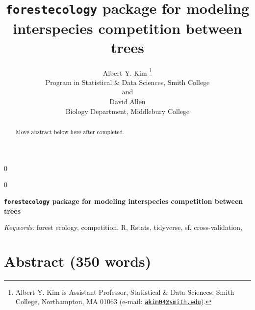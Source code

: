\documentclass[12pt]{article}
\newcommand{\blind}{0}
\begin{document}
\def\spacingset#1{\renewcommand{\baselinestretch}%
{#1}\small\normalsize} \spacingset{1}



\blind
{
  \title{\bf \texttt{forestecology} package for modeling interspecies competition
between trees}

  \author{
        Albert Y. Kim \thanks{Albert Y. Kim is Assistant Professor, Statistical \& Data Sciences,
Smith College, Northampton, MA 01063 (e-mail:
\href{mailto:akim04@smith.edu}{\nolinkurl{akim04@smith.edu}}).} \\
    Program in Statistical \& Data Sciences, Smith College\\
     and \\     David Allen \\
    Biology Department, Middlebury College\\
      }
  \maketitle
} \fi

\blind
{
  \bigskip
  \bigskip
  \bigskip
  \begin{center}
    {\LARGE\bf \texttt{forestecology} package for modeling interspecies competition
between trees}
  \end{center}
  \medskip
} \fi

\bigskip
\begin{abstract}
Move abstract below here after completed.
\end{abstract}

\noindent%
{\it Keywords:} forest ecology, competition, R, Rstats, tidyverse, sf, cross-validation,
\vfill

\newpage
\spacingset{1.45} %

\linenumbers

\hypertarget{abstract-350-words}{%
\section{Abstract (350 words)}\label{abstract-350-words}}
\end{document}
